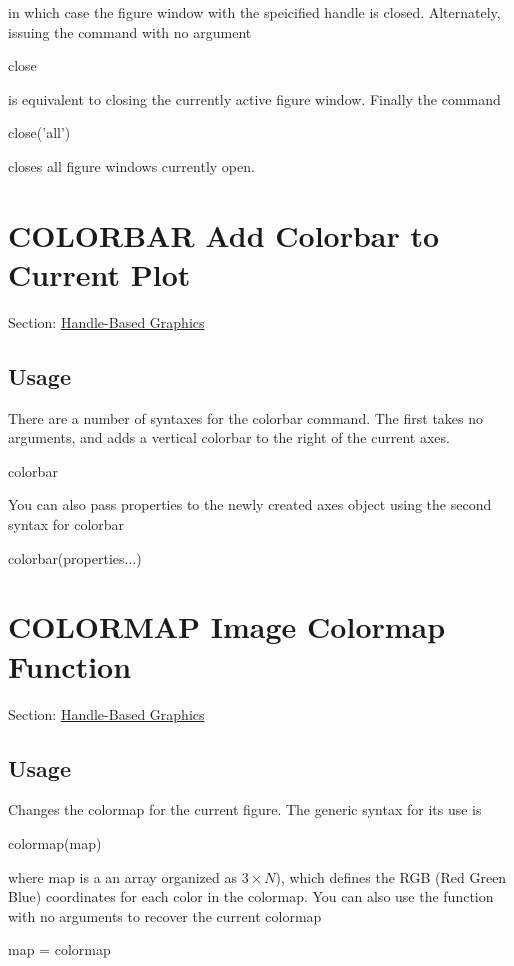  in which case the figure window with the speicified {\ttfamily handle} is closed. Alternately, issuing the command with no argument \begin{DoxyVerb}   close
\end{DoxyVerb}
 is equivalent to closing the currently active figure window. Finally the command \begin{DoxyVerb}   close('all')
\end{DoxyVerb}
 closes all figure windows currently open. \hypertarget{handle_colorbar}{}\section{C\-O\-L\-O\-R\-B\-A\-R Add Colorbar to Current Plot}\label{handle_colorbar}
Section\-: \hyperlink{sec_handle}{Handle-\/\-Based Graphics} \hypertarget{vtkwidgets_vtkxyplotwidget_Usage}{}\subsection{Usage}\label{vtkwidgets_vtkxyplotwidget_Usage}
There are a number of syntaxes for the {\ttfamily colorbar} command. The first takes no arguments, and adds a vertical colorbar to the right of the current axes. \begin{DoxyVerb}  colorbar
\end{DoxyVerb}
 You can also pass properties to the newly created axes object using the second syntax for colorbar \begin{DoxyVerb}  colorbar(properties...)
\end{DoxyVerb}
 \hypertarget{handle_colormap}{}\section{C\-O\-L\-O\-R\-M\-A\-P Image Colormap Function}\label{handle_colormap}
Section\-: \hyperlink{sec_handle}{Handle-\/\-Based Graphics} \hypertarget{vtkwidgets_vtkxyplotwidget_Usage}{}\subsection{Usage}\label{vtkwidgets_vtkxyplotwidget_Usage}
Changes the colormap for the current figure. The generic syntax for its use is \begin{DoxyVerb}  colormap(map)
\end{DoxyVerb}
 where {\ttfamily map} is a an array organized as $3 \times N$), which defines the R\-G\-B (Red Green Blue) coordinates for each color in the colormap. You can also use the function with no arguments to recover the current colormap \begin{DoxyVerb}  map = colormap
\end{DoxyVerb}
